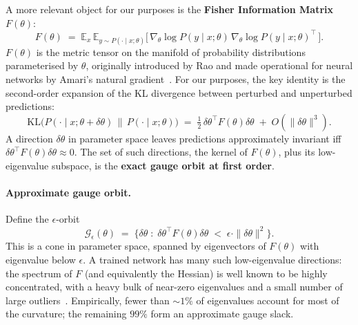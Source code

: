 \documentclass[11pt, a4paper]{article}
\theoremstyle{plain}
\theoremstyle{definition}
\theoremstyle{remark}
\begin{document}
A more relevant object for our purposes is the \textbf{Fisher Information Matrix} $F(\theta)$:
\[
F(\theta) \;=\; \mathbb{E}_{x}\,\mathbb{E}_{y \sim P(\cdot \mid x; \theta)}\!\big[\, \nabla_\theta \log P(y \mid x; \theta)\, \nabla_\theta \log P(y \mid x; \theta)^{\!\top}\, \big].
\]
$F(\theta)$ is the metric tensor on the manifold of probability distributions parameterised by $\theta$, originally introduced by Rao and made operational for neural networks by Amari's natural gradient~\cite{amari1998natural}.
For our purposes, the key identity is the second-order expansion of the KL divergence between perturbed and unperturbed predictions:
\begin{equation}
\mathrm{KL}\!\big(P(\cdot \mid x; \theta + \delta\theta) \,\big\|\, P(\cdot \mid x; \theta)\big) \;=\; \tfrac{1}{2}\,\delta\theta^{\!\top} F(\theta) \delta\theta \;+\; O(\|\delta\theta\|^{3}).
\label{eq:fisher-kl}
\end{equation}
A direction $\delta\theta$ in parameter space leaves predictions approximately invariant iff $\delta\theta^{\!\top} F(\theta) \delta\theta \approx 0$.
The set of such directions, the kernel of $F(\theta)$, plus its low-eigenvalue subspace, is the \textbf{exact gauge orbit at first order}.

\paragraph{Approximate gauge orbit.}
Define the $\epsilon$-orbit
\[
\mathcal{G}_{\epsilon}(\theta) \;=\; \big\{ \delta\theta \;:\; \delta\theta^{\!\top} F(\theta) \delta\theta \;<\; \epsilon \cdot \|\delta\theta\|^{2} \big\}.
\]
This is a cone in parameter space, spanned by eigenvectors of $F(\theta)$ with eigenvalue below $\epsilon$.
A trained network has many such low-eigenvalue directions: the spectrum of $F$ (and equivalently the Hessian) is well known to be highly concentrated, with a heavy bulk of near-zero eigenvalues and a small number of large outliers~\cite{sagun2016eigenvalues, papyan2019measurements, ghorbani2019investigation}.
Empirically, fewer than $\sim 1\%$ of eigenvalues account for most of the curvature; the remaining $99\%$ form an approximate gauge slack.
\end{document}
